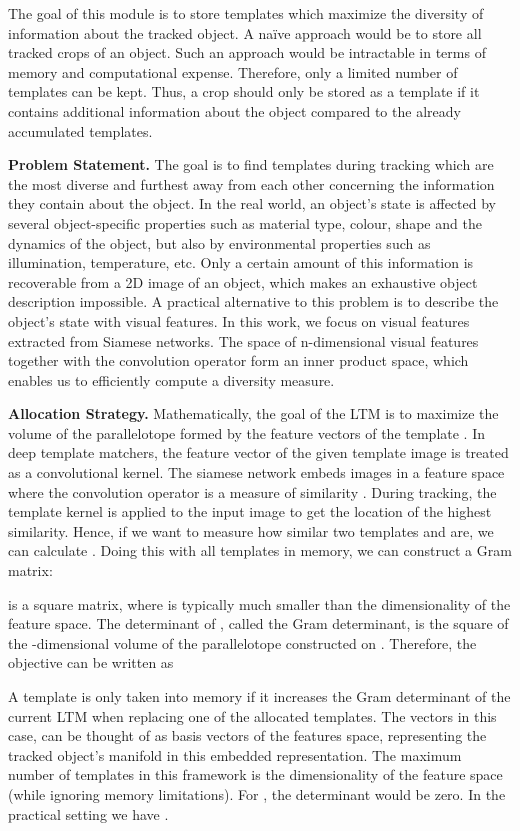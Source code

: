 \documentclass{article}
\begin{document}
The goal of this module is to store templates which maximize the diversity of information about the tracked object. A na\"ive approach would be to store all tracked crops of an object. Such an approach would be intractable in terms of memory and computational expense. Therefore, only a limited number of templates  can be kept. Thus, a crop should only be stored as a template if it contains additional information about the object compared to the already accumulated templates.

\textbf{Problem Statement.} The goal is to find templates during tracking which are the most diverse and furthest away from each other concerning the information they contain about the object. In the real world, an object's state is affected by several object-specific properties such as material type, colour, shape and the dynamics of the object, but also by environmental properties such as illumination, temperature, etc. Only a certain amount of this information is recoverable from a 2D image of an object, which makes an exhaustive object description impossible. A practical alternative to this problem is to describe the object's state with visual features. In this work, we focus on visual features extracted from Siamese networks. The space of n-dimensional visual features together with the convolution operator form an inner product space, which enables us to efficiently compute a diversity measure.

\textbf{Allocation Strategy.} Mathematically, the goal of the LTM is to maximize the volume  of the parallelotope formed by the feature vectors  of the template . In deep template matchers, the feature vector of the given template image  is treated as a convolutional kernel. The siamese network embeds images in a feature space where the convolution operator is a measure of similarity \cite{bertinetto2016fully}. During tracking, the template kernel  is applied to the input image to get the location of the highest similarity. Hence, if we want to measure how similar two templates  and  are, we can calculate . Doing this with all templates in memory, we can construct a Gram matrix:


 is a square  matrix, where  is typically much smaller than the dimensionality of the feature space. The determinant of , called the Gram determinant, is the square of the -dimensional volume  of the parallelotope constructed on . Therefore, the objective can be written as

A template is only taken into memory if it increases the Gram determinant of the current LTM when replacing one of the allocated templates. The vectors  in this case, can be thought of as basis vectors of the features space, representing the tracked object's manifold in this embedded representation. The maximum number of templates in this framework is the dimensionality of the feature space  (while ignoring memory limitations). For , the determinant would be zero. In the practical setting we have  .
\end{document}
